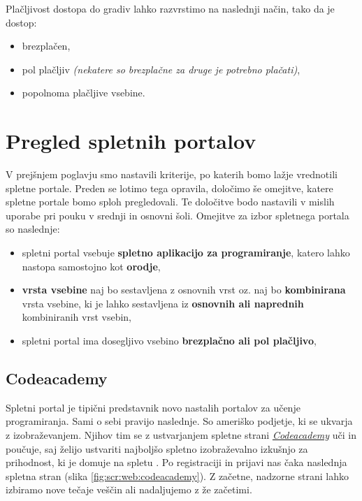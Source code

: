 Plačljivost dostopa do gradiv lahko razvrstimo na naslednji način,
tako da je dostop:

\begin{itemize}
  \tightlist
\item brezplačen,
\item pol plačljiv \emph{(nekatere so brezplačne za druge je potrebno
    plačati)},
\item popolnoma plačljive vsebine.
\end{itemize}

\section{Pregled spletnih portalov}
\label{sec:pregled_spletnih_port}

V prejšnjem poglavju smo nastavili kriterije, po katerih bomo lažje
vrednotili spletne portale. Preden se lotimo tega opravila, določimo
še omejitve, katere spletne portale bomo sploh pregledovali. Te
določitve bodo nastavili v mislih uporabe pri pouku v srednji in
osnovni šoli. Omejitve za izbor spletnega portala so naslednje:

\begin{itemize}
  \tightlist
\item spletni portal vsebuje \textbf{spletno aplikacijo za
    programiranje}, katero lahko nastopa samostojno kot
  \textbf{orodje},
\item \textbf{vrsta vsebine} naj bo sestavljena z osnovnih vrst
  oz. naj bo \textbf{kombinirana} vrsta vsebine, ki je lahko
  sestavljena iz \textbf{osnovnih ali naprednih} kombiniranih vrst vsebin,
\item spletni portal ima dosegljivo vsebino \textbf{brezplačno ali pol
  plačljivo},
\end{itemize}

\subsection{Codeacademy}

Spletni portal je tipični predstavnik novo nastalih portalov za učenje
programiranja. Sami o sebi pravijo naslednje. So ameriško podjetje, ki
se ukvarja z izobraževanjem. Njihov tim se z ustvarjanjem spletne
strani \emph{\href{https://www.codecademy.com/}{Codeacademy}} uči in
poučuje, saj želijo ustvariti najboljšo spletno izobraževalno izkušnjo
za prihodnost, ki je domuje na spletu \cite{web:codeacademy}. Po
registraciji in prijavi nas čaka naslednja spletna stran (slika
\ref{fig:scr:web:codeacademy}). Z začetne, nadzorne strani lahko
izbiramo nove tečaje veščin ali nadaljujemo z že začetimi.

